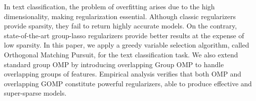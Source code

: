 In text classification, the problem of overfitting arises due to the high dimensionality, making regularization essential. Although classic regularizers provide sparsity, they fail to return highly accurate models. On the contrary, state-of-the-art group-lasso regularizers provide better results at the expense of low sparsity. In this paper, we apply a greedy variable selection algorithm, called Orthogonal Matching Pursuit, for the text classification task. We also extend standard group OMP by introducing overlapping Group OMP to handle overlapping groups of features. Empirical analysis verifies that both OMP and overlapping GOMP constitute powerful regularizers, able to produce effective and super-sparse models.
